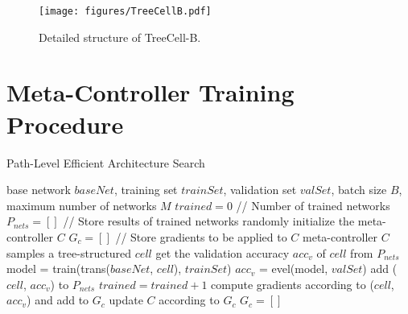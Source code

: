 \documentclass{article}
\begin{document}
\begin{figure}[h]
	\centering
	\texttt{[image: figures/TreeCellB.pdf]}
	\caption{Detailed structure of TreeCell-B.}
	\label{fig:tree-cell-b}
\end{figure}

\section{Meta-Controller Training Procedure}
\begin{algorithm}[h]
	\caption{Path-Level Efficient Architecture Search}
	\label{alg:path-level-eas}
	{\small	
		\begin{algorithmic}[1]
			\REQUIRE
			base network $baseNet$, training set $trainSet$, validation set $valSet$, batch size $B$, maximum number of networks $M$ 
			\STATE $trained = 0$  // Number of trained networks
            \STATE $P_{nets} = []$ // Store results of trained networks
            \STATE randomly initialize the meta-controller $C$
            \STATE $G_c = []$ // Store gradients to be applied to $C$
            \STATE meta-controller $C$ samples a tree-structured $cell$
            \STATE get the validation accuracy $acc_v$ of $cell$ from $P_{nets}$
            \ELSE 
            \STATE model = train(trans($baseNet$, $cell$), $trainSet$)
            \STATE $acc_v$ = evel(model, $valSet$)
            \STATE add ($cell$, $acc_v$) to $P_{nets}$
            \STATE $trained = trained + 1$ 
            \ENDIF
            \STATE compute gradients according to ($cell$, $acc_v$) and add to $G_c$
            \STATE update $C$ according to $G_c$
            \STATE $G_c = []$
            \ENDIF
            \ENDWHILE	
		\end{algorithmic}
	}
\end{algorithm}
\end{document}
